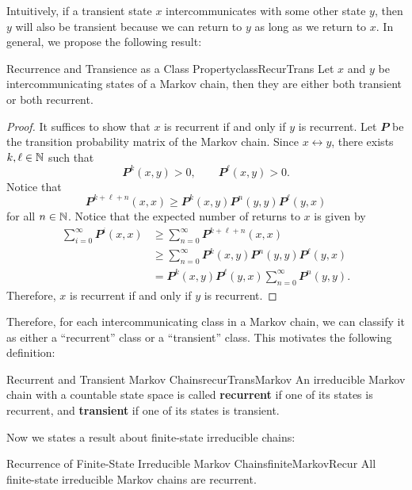 \documentclass[math, code]{amznotes}
\theoremstyle{remark}
\begin{document}
Intuitively, if a transient state $x$ intercommunicates with some other state $y$, then $y$ will also be transient because we can return to $y$ as long as we return to $x$. In general, we propose the following result:
\begin{probox}{Recurrence and Transience as a Class Property}{classRecurTrans}
    Let $x$ and $y$ be intercommunicating states of a Markov chain, then they are either both transient or both recurrent.
    \tcblower
    \begin{proof}
        It suffices to show that $x$ is recurrent if and only if $y$ is recurrent. Let $\mathbfit{P}$ be the transition probability matrix of the Markov chain. Since $x \leftrightarrow y$, there exists $k, \ell \in \mathbb{N}$ such that
        \begin{equation*}
            \mathbfit{P}^k\left(x, y\right) > 0, \qquad \mathbfit{P}^{\ell}\left(x, y\right) > 0.
        \end{equation*}
        Notice that 
        \begin{equation*}
            \mathbfit{P}^{k + \ell + n}\left(x, x\right) \geq \mathbfit{P}^{k}\left(x, y\right)\mathbfit{P}^{n}\left(y, y\right)\mathbfit{P}^{\ell}\left(y, x\right)
        \end{equation*}
        for all $n \in \mathbb{N}$. Notice that the expected number of returns to $x$ is given by 
        \begin{align*}
            \sum_{i = 0}^{\infty}\mathbfit{P}^i\left(x, x\right) & \geq \sum_{n = 0}^{\infty}\mathbfit{P}^{k + \ell + n}\left(x, x\right) \\
            & \geq \sum_{n = 0}^{\infty}\mathbfit{P}^{k}\left(x, y\right)\mathbfit{P}^{n}\left(y, y\right)\mathbfit{P}^{\ell}\left(y, x\right) \\
            & = \mathbfit{P}^{k}\left(x, y\right)\mathbfit{P}^{\ell}\left(y, x\right)\sum_{n = 0}^{\infty}\mathbfit{P}^{n}\left(y, y\right).
        \end{align*}
        Therefore, $x$ is recurrent if and only if $y$ is recurrent.
    \end{proof}
\end{probox}
Therefore, for each intercommunicating class in a Markov chain, we can classify it as either a ``recurrent'' class or a ``transient'' class. This motivates the following definition:
\begin{dfnbox}{Recurrent and Transient Markov Chains}{recurTransMarkov}
    An irreducible Markov chain with a countable state space is called {\color{red} \textbf{recurrent}} if one of its states is recurrent, and {\color{red} \textbf{transient}} if one of its states is transient.
\end{dfnbox}
Now we states a result about finite-state irreducible chains:
\begin{probox}{Recurrence of Finite-State Irreducible Markov Chains}{finiteMarkovRecur}
    All finite-state irreducible Markov chains are recurrent.
\end{probox}
\end{document}
